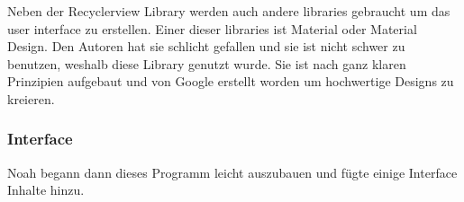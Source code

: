 \documentclass[a4paper,11pt]{article}
\begin{document}
Neben der Recyclerview Library werden auch andere libraries gebraucht um das \gls{user interface} zu erstellen. Einer dieser libraries ist Material oder Material Design. 
Den Autoren hat sie schlicht gefallen und sie ist nicht schwer zu benutzen, weshalb diese Library genutzt wurde. Sie ist nach ganz klaren Prinzipien aufgebaut 
und von Google erstellt worden um hochwertige Designs zu kreieren. \cite{materialDesigne}




\subsubsection{Interface}

Noah begann dann dieses Programm leicht auszubauen und fügte einige Interface Inhalte hinzu. 

\begingroup
\setlength{\intextsep}{10pt}
\setlength{\columnsep}{15pt}
\end{document}
